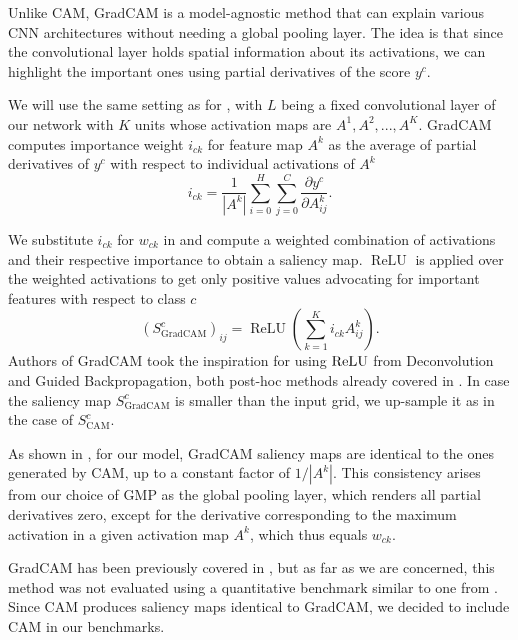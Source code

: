 Unlike CAM, GradCAM \cite{grad-cam} is a model-agnostic method that can explain various CNN architectures without needing a global pooling layer.
The idea is that since the convolutional layer holds spatial information about its activations, we can highlight the important ones using partial derivatives of the score $y^c$.

We will use the same setting as for , with $L$ being a fixed convolutional layer of our network with $K$ units whose activation maps are $A^1, A^2, ..., A^K$.
GradCAM computes importance weight $i_{ck}$ for feature map $A^k$ as the average of partial derivatives of $y^c$ with respect to individual activations of $A^k$ \cite{grad-cam}
\begin{equation}\label{grad-cam-weights}
    i_{ck} = \frac{1}{|A^k|} \sum_{i=0}^H \sum_{j=0}^C \frac{\partial y^c}{\partial A^k_{ij}}.
\end{equation}

We substitute $i_{ck}$ for $w_{ck}$ in  and compute a weighted combination of activations and their respective importance to obtain a saliency map.
$\operatorname{ReLU}$ is applied over the weighted activations to get only positive values advocating for important features with respect to class $c$ \cite{grad-cam}
\begin{equation}
    (S^c_{\text{GradCAM}})_{ij} = \operatorname{ReLU}(\sum_{k=1}^K i_{ck} A^k_{ij}).
\end{equation}
Authors of GradCAM took the inspiration for using $\operatorname{ReLU}$ from Deconvolution and Guided Backpropagation, both post-hoc methods already covered in \cite{gallo}.
In case the saliency map $S^c_{\text{GradCAM}}$ is smaller than the input grid, we up-sample it as in the case of $S^c_{\text{CAM}}$.

As shown in \cite{bajger-grad-cam}, for our model, GradCAM saliency maps are identical to the ones generated by CAM, up to a constant factor of ${1}/{|A^k|}$.
This consistency arises from our choice of GMP as the global pooling layer, which renders all partial derivatives zero, except for the derivative corresponding to the maximum activation in a given activation map $A^k$, which thus equals $w_{ck}$.

GradCAM has been previously covered in \cite{hruska-grad-cam, krajnansky-grad-cam, bajger-grad-cam}, but as far as we are concerned, this method was not evaluated using a quantitative benchmark similar to one from \cite{gallo}.
Since CAM produces saliency maps identical to GradCAM, we decided to include CAM in our benchmarks.

